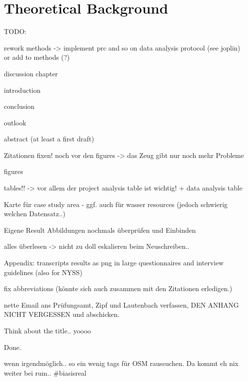 
\chapter{Theoretical Background} %

\label{ChapterX} %


TODO:

rework methods -> implement prc and so on
data analysis protocol (see joplin) or add to methods (?)

discussion chapter

introduction

conclusion

outlook

abstract (at least a first draft)

Zitationen fixen! noch vor den figures -> das Zeug gibt nur noch mehr Probleme

figures

tables!! -> vor allem der project analysis table ist wichtig! + data analysis table

Karte für case study area - ggf. auch für wasser resources (jedoch schwierig welchen Datensatz..)

Eigene Result Abbildungen nochmals überprüfen und Einbinden

alles überlesen -> nicht zu doll eskalieren beim Neuschreiben..

Appendix:
transcripts
results as png in large
questionnaires and interview guidelines (also for NYSS)

fix abbreviations (könnte sich auch zusammen mit den Zitationen erledigen.)

nette Email ans Prüfungsamt, Zipf und Lautenbach verfassen, DEN ANHANG NICHT VERGESSEN und abschicken.

Think about the title.. yoooo

Done.


wenn irgendmöglich.. so ein wenig tags für OSM raussuchen. Da kommt eh nix weiter bei rum.. #biasisreal





























